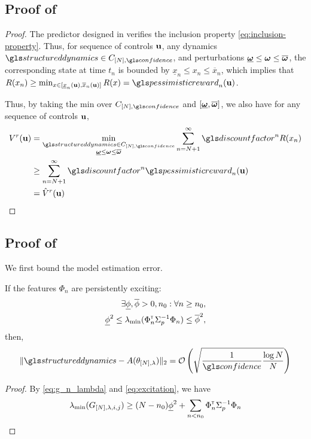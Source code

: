 \begin{subappendices}
	
	\subsection{Proof of }
	\label{sec:proof-lower-bound}
	\begin{proof}
		The predictor designed in  verifies the inclusion property \eqref{eq:inclusion-property}. Thus, for sequence of controls $\mathbf{u}$, any dynamics $\structureddynamics\in C_{[N],\confidence}$, and perturbations $\underline{\bm{\omega}} \leq \bm{\omega} \leq \overline{\bm{\omega}}$, the corresponding state at time $t_n$ is bounded by $\underline{x}_n \leq x_n \leq \overline{x}_n$, which implies that $R(x_n) \geq \min_{x\in[\underline{x}_n(\bu), \overline{x}_n(\bu)]}  R(x) = \pessimisticreward_n(\bu)$.
		
		Thus, by taking the min over $C_{[N],\confidence}$ and $[\underline{\bm{\omega}}, \overline{\bm{\omega}}]$, we also have for any sequence of controls $\mathbf{u}$,
		\begin{align*}
		V^r(\bu) &= \min_{\substack{\structureddynamics\in C_{[N],\confidence}\\ \underline{\bom} \leq \bom \leq \overline{\bom}}} \sum_{n=N+1}^\infty \discount^n R(x_n)\\
		&\geq \sum_{n=N+1}^\infty \discount^n \pessimisticreward_n(\bu)\\
		&= \hat{V}^r(\bu)
		\end{align*}
	\end{proof}
	
	\subsection{Proof of }
	\label{sec:proof-minimax-regret-bound}
	We first bound the model estimation error.
	\begin{lemma}
		\begin{leftbar}[lemmabar]
		If the features $\Phi_n$ are persistently exciting:
		\begin{align}
		\label{eq:excitation}
		\exists \underline{\phi},\overline{\phi}>0, n_0: \forall n\geq n_0,\nonumber\\ \underline{\phi}^2 \leq \lambda_{\min}(\Phi_{n}^{\mathsf{\scriptscriptstyle T}}\Sigma_{p}^{-1}\Phi_{n}) \leq \overline{\phi}^2,
		\end{align}
		then,
		\[\|\structureddynamics - A(\theta_{[N],\lambda})\|_2 = \cO\left( \sqrt{\frac{1}{\confidence}\frac{\log N}{N}} \right) \]
	\end{leftbar}
	\end{lemma}
	\begin{proof}
		By \eqref{eq:g_n_lambda} and \eqref{eq:excitation}, we have $$\lambda_{\min}(G_{[N],\lambda,i,j}) \geq (N-n_0)\underline{\phi}^2 + \sum_{n<n_0}\Phi_{n}^{\mathsf{\scriptscriptstyle T}}\Sigma_{p}^{-1}\Phi_{n}$$
		

\end{proof}
\end{subappendices}
